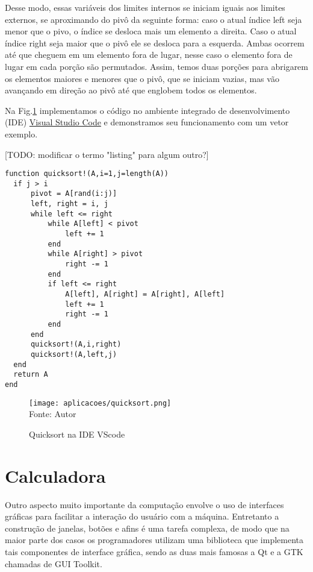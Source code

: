 Desse modo, essas variáveis dos limites internos se iniciam iguais aos limites externos, se aproximando do pivô da seguinte forma: 
caso o atual índice left seja menor que o pivo, o índice se desloca mais um elemento a direita.
Caso o atual índice right seja maior que o pivô ele se desloca para a esquerda.
Ambas ocorrem até que cheguem em um elemento fora de lugar, nesse caso o elemento fora de lugar em cada porção são permutados. 
Assim, temos duas porções para abrigarem os elementos maiores e menores que o pivô, que se iniciam vazias, mas vão avançando em direção ao pivô até que englobem todos os elementos. 

Na Fig.\ref{quicksort} implementamos o código no ambiente integrado de desenvolvimento (IDE) \href{https://code.visualstudio.com/docs}{Visual Studio Code} e demonstramos seu funcionamento com um vetor exemplo. 

[TODO: modificar o termo "listing" para algum outro?] 
\begin{lstlisting}[label={quicksort_code},caption={Implementação do algoritmo quicksort em Julia}]
  function quicksort!(A,i=1,j=length(A))
  if j > i
      pivot = A[rand(i:j)] 
      left, right = i, j
      while left <= right
          while A[left] < pivot
              left += 1
          end
          while A[right] > pivot
              right -= 1
          end
          if left <= right
              A[left], A[right] = A[right], A[left]
              left += 1
              right -= 1
          end
      end
      quicksort!(A,i,right)
      quicksort!(A,left,j)
  end
  return A
end
\end{lstlisting}

\begin{figure}[H]
   \begin{center}
       \caption{Quicksort na IDE VScode} \label{quicksort}
       \texttt{[image: aplicacoes/quicksort.png]} \\
       {\tiny \sf Fonte: Autor}
   \end{center}
\end{figure}

\section{Calculadora}
Outro aspecto muito importante da computação envolve o uso de interfaces gráficas para facilitar a interação do usuário com a máquina.
Entretanto a construção de janelas, botões e afins é uma tarefa complexa, de modo que na maior parte dos casos os programadores utilizam uma biblioteca que implementa tais componentes de interface gráfica, sendo as duas mais famosas a Qt e a GTK chamadas de GUI Toolkit. %

